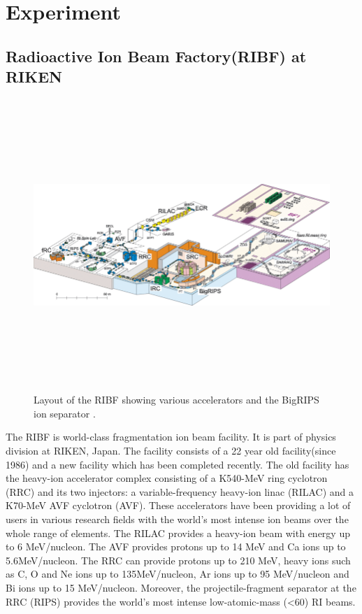 \chapter{Experiment} \label{ch:experiment}

\section{Radioactive Ion Beam Factory(RIBF) at RIKEN}

\begin{figure}[h!]
\centering
\includegraphics[width=15cm, height=11cm]{figures/Layout-of-the-RIKEN-RI-Beam-Factory.png}
\caption[Layout of the RIBF showing various accelerators]{Layout of the RIBF showing various accelerators and the BigRIPS ion separator \citep{rikenasc}. }
\end{figure}
The RIBF is world-class fragmentation ion beam facility. It is part of physics division at RIKEN, Japan. The facility consists of a 22 year old facility(since 1986) and a new facility which has been completed recently. The old facility has the heavy-ion accelerator complex consisting of a K540-MeV ring cyclotron (RRC) and its two injectors: a variable-frequency heavy-ion linac (RILAC) and a K70-MeV AVF cyclotron (AVF). These accelerators have been providing a lot of users in various research fields with the world’s most intense ion beams over the whole range of elements. The RILAC provides a heavy-ion beam with energy up to 6 MeV/nucleon. The AVF provides protons up to 14 MeV and Ca ions up to 5.6MeV/nucleon. The RRC can provide protons up to 210 MeV, heavy ions such as C, O and Ne ions up to 135MeV/nucleon, Ar ions up to 95 MeV/nucleon and Bi ions up to 15 MeV/nucleon. Moreover, the projectile-fragment separator at the RRC (RIPS) provides the world's most intense low-atomic-mass (\textless 60) RI beams.

